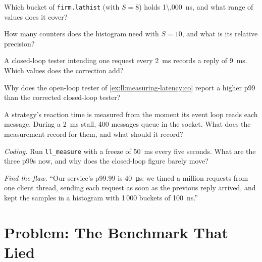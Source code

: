 \begin{exercise}[$\star$]\label{exo:ll:measuring-latency:2}
Which bucket of \texttt{firm.lathist} (with $S = 8$) holds \qty{1\,000}{\nano\second}, and what range of values does it
cover?
\end{exercise}

\begin{exercise}[$\star$]\label{exo:ll:measuring-latency:3}
How many counters does the histogram need with $S = 10$, and what is its relative precision?
\end{exercise}

\begin{exercise}[$\star\star$]\label{exo:ll:measuring-latency:4}
A closed-loop tester intending one request every \qty{2}{\milli\second} records a reply of \qty{9}{\milli\second}. Which
values does the correction add?
\end{exercise}

\begin{exercise}[$\star\star$]\label{exo:ll:measuring-latency:5}
Why does the open-loop tester of \cref{ex:ll:measuring-latency:co} report a higher p99 than the corrected closed-loop
tester?
\end{exercise}

\begin{exercise}[$\star\star$]\label{exo:ll:measuring-latency:6}
A strategy's reaction time is measured from the moment its event loop reads each message. During a \qty{2}{\milli\second}
stall, 400 messages queue in the socket. What does the measurement record for them, and what should it record?
\end{exercise}

\begin{exercise}[$\star\star\star$]\label{exo:ll:measuring-latency:7}
\emph{Coding.} Run \texttt{ll\_measure} with a freeze of \qty{50}{\milli\second} every five seconds. What are the three p99s
now, and why does the closed-loop figure barely move?
\end{exercise}

\begin{exercise}[$\star\star\star$]\label{exo:ll:measuring-latency:8}
\emph{Find the flaw.} ``Our service's p99.99 is \qty{40}{\micro\second}: we timed a million requests from one client
thread, sending each request as soon as the previous reply arrived, and kept the samples in a histogram with 1\,000
buckets of \qty{100}{\nano\second}.''
\end{exercise}

\section{Problem: The Benchmark That Lied}

